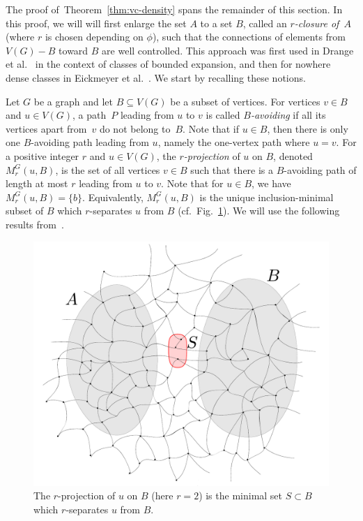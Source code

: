 \medskip
The proof of~Theorem~\ref{thm:vc-density} spans the remainder of this section.
In this proof, we will
will first enlarge the set $A$ to a set $B$, called
an \emph{$r$-closure of~$A$} (where $r$ is chosen depending on $\phi$), such 
that the connections of elements from $V(G)-B$ 
toward $B$ are well controlled. This approach
was first used in Drange et al.~\cite{drange2016kernelization} in the context of classes of bounded expansion, 
and then for nowhere dense classes in Eickmeyer et al.~\cite{eickmeyer2016neighborhood}. 
We start by recalling these notions.

Let $G$ be a graph and let $B\subseteq V(G)$ be a subset of vertices. For vertices $v\in B$ and $u\in V(G)$, a path~$P$ leading from $u$ to $v$ is called {\em{$B$-avoiding}}
if all its vertices apart from~$v$ do not belong to~$B$. Note that if $u\in B$, then there is only one $B$-avoiding path leading from $u$, namely the one-vertex path where $u=v$.
For a positive integer $r$ and $u\in V(G)$, the {\em{$r$-projection}} of $u$ on $B$, denoted $M^G_r(u,B)$, is the set of all vertices $v\in B$ such that there is
a $B$-avoiding path of length at most $r$ leading from $u$ to $v$. Note that for $u\in B$, we have $M^G_r(u,B)=\{b\}$.
Equivalently, $M^G_r(u,B)$ is the unique inclusion-minimal
subset of $B$ which $r$-separates $u$ from $B$ (cf.~Fig.~\ref{fig:projection}). We will use the following results from~\cite{drange2016kernelization,eickmeyer2016neighborhood}.

\vspace{-2pt}
\begin{figure}[h!]
	\centering
		\includegraphics[scale=0.35,page=2]{pics}
	\caption{The  $r$-projection of $u$ on $B$
	(here $r=2$)
	is the minimal set  $S\subset B$
	which $r$-separates $ u$ from $B$.
	}
	\label{fig:projection}
\end{figure}



